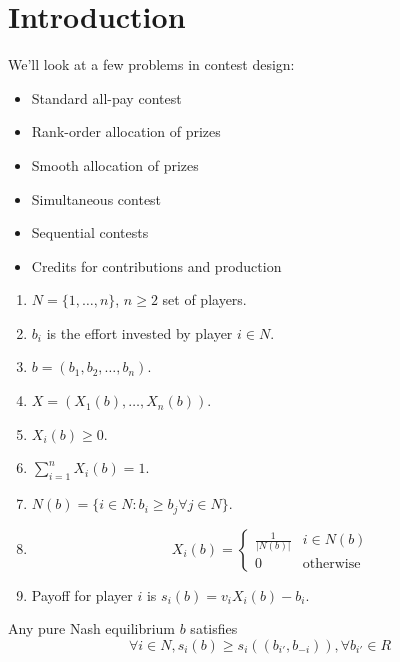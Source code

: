 
\chapter{Introduction}
\label{cha:introduction}

We'll look at a few problems in contest design:

\begin{itemize}
\item Standard all-pay contest
\item Rank-order allocation of prizes
\item Smooth allocation of prizes
\item Simultaneous contest
\item Sequential contests
\item Credits for contributions and production
\end{itemize}

\begin{defn}
  \label{defn:fundamentals:1}
  \begin{enumerate}
  \item $N = \{ 1, \dots, n \}$, $n \geq 2$ set of players.
  \item $b_{i}$ is the effort invested by player $i \in N$.
  \item $b = (b_{1}, b_{2}, \dots, b_{n})$.
  \item $X = (X_{1}(b), \dots, X_{n}(b))$.
  \item $X_{i}(b) \geq 0$.
  \item $\sum_{i=1}^{n} X_{i}(b) = 1$.
  \item $N(b) = \{ i \in N: b_{i} \geq b_{j} \forall j \in N \}$.
  \item \begin{equation}
      \label{eq:1}
      X_{i}(b) =
      \begin{cases}
        \frac{1}{|N(b)|} & i \in N(b) \\
        0 & \text{otherwise}
      \end{cases}
    \end{equation}
  \item Payoff for player $i$ is $s_{i}(b) = v_{i} X_{i}(b) - b_{i}$.
  \end{enumerate}
\end{defn}

Any pure Nash equilibrium $b$ satisfies
\begin{equation}
  \label{eq:2}
  \forall i \in N, s_{i}(b) \geq s_{i}((b_{i'}, b_{-i})), \forall
  b_{i'} \in R
\end{equation}

